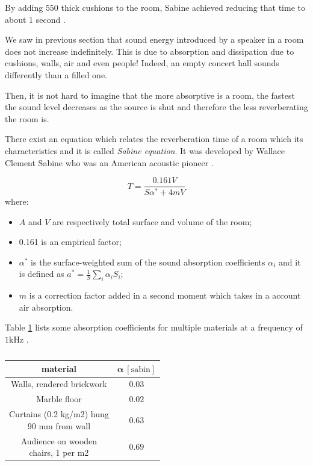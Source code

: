 \documentclass[a4paper]{article}
\begin{document}
By adding $550$ thick cushions to the room, Sabine achieved reducing that time to about 1 second \cite[p. ~300]{book:acoustic2}.

We saw in previous section that sound energy introduced by a speaker in a room does not increase indefinitely. This is due to absorption and dissipation due to cushions, walls, air and even people! Indeed, an empty concert hall sounds differently than a filled one.


Then, it is not hard to imagine that the more absorptive is a room, the fastest the sound level decreases as the source is shut and therefore the less reverberating the room is.

There exist an equation which relates the reverberation time of a room which its characteristics and it is called \textit{Sabine equation}. It was developed by Wallace Clement Sabine  who was an American acoustic pioneer \cite[p. ~316]{book:acoustic}. 



\begin{equation}
T = \frac{0.161 V}{S \alpha^* + 4 m V}
\end{equation}
where:
\begin{itemize}
\item $A$ and $V$ are respectively total surface and volume of the room;
\item 0.161 is an empirical factor;
\item $\alpha^*$ is the surface-weighted sum of the sound absorption coefficients $\alpha_i$ and it is defined as $a^* = \frac{1}{S}\sum_i{\alpha_i S_i}$;
\item $m$ is a correction factor added in a second moment which takes in a account air absorption.
\end{itemize}


Table \ref{table:material} lists some absorption coefficients for multiple materials at a frequency of $1\mathrm{kHz}$ \cite{site:acoustic_absorption}.




\begin{table}
\caption{}
\begin{tabular}{ |c|c| } 
 \hline
 \textbf{material} & $\bm{\alpha\  [\mathrm{sabin}]}$\\ 
 \hline\hline
 Walls, rendered brickwork & $0.03$\\ 
 \hline
 Marble floor & $0.02$\\ 
 \hline
 \makecell{Curtains (0.2 kg/m2) hung \\ 90 mm from wall} & $0.63$\\
 \hline
 \makecell{Audience on wooden\\ chairs, 1 per m2} & $0.69$ \\
 \hline
\end{tabular}
\label{table:material}
\end{table}
\end{document}
